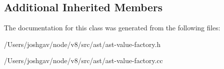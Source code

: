 \subsection*{Additional Inherited Members}


The documentation for this class was generated from the following files\+:\begin{DoxyCompactItemize}
\item 
/\+Users/joshgav/node/v8/src/ast/ast-\/value-\/factory.\+h\item 
/\+Users/joshgav/node/v8/src/ast/ast-\/value-\/factory.\+cc\end{DoxyCompactItemize}
